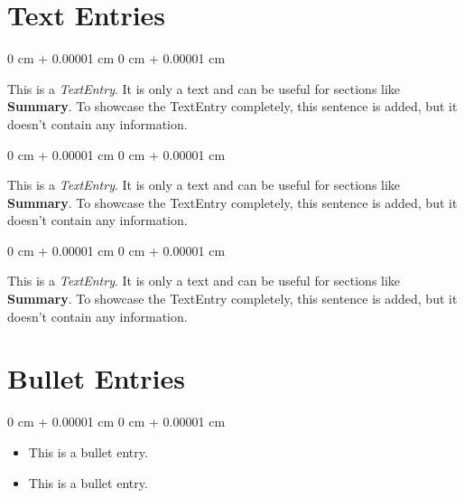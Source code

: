 \documentclass[10pt, letterpaper]{article}
\newenvironment{highlightsforbulletentries}{
    \begin{itemize}[
        topsep=0.10 cm,
        parsep=0.10 cm,
        partopsep=0pt,
        itemsep=0pt,
        leftmargin=10pt
    ]
}{
    \end{itemize}
} %
\newenvironment{onecolentry}{
    \begin{adjustwidth}{
        0 cm + 0.00001 cm
    }{
        0 cm + 0.00001 cm
    }
}{
    \end{adjustwidth}
} %
\begin{document}
    \vspace{5 pt - 0.3 cm}


    \section{Text Entries}



        
        \begin{onecolentry}
            This is a \textit{TextEntry}. It is only a text and can be useful for sections like \textbf{Summary}. To showcase the TextEntry completely, this sentence is added, but it doesn't contain any information.
        \end{onecolentry}

        \vspace{0.2 cm}

        \begin{onecolentry}
            This is a \textit{TextEntry}. It is only a text and can be useful for sections like \textbf{Summary}. To showcase the TextEntry completely, this sentence is added, but it doesn't contain any information.
        \end{onecolentry}

        \vspace{0.2 cm}

        \begin{onecolentry}
            This is a \textit{TextEntry}. It is only a text and can be useful for sections like \textbf{Summary}. To showcase the TextEntry completely, this sentence is added, but it doesn't contain any information.
        \end{onecolentry}


    
    \section{Bullet Entries}

    \begin{onecolentry}
        \begin{highlightsforbulletentries}


        \item This is a bullet entry.

        \item This is a bullet entry.


        \end{highlightsforbulletentries}
    \end{onecolentry}
\end{document}
